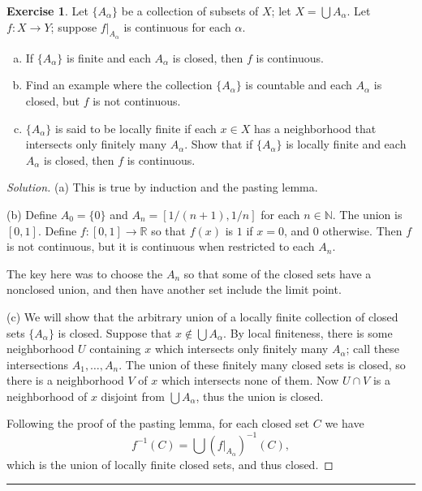 \documentclass{article}
\theoremstyle{definition}
\newtheorem{exercise}{Exercise}[section]
\begin{document}
\begin{exercise}
  Let $\{A_\alpha\}$ be a collection of subsets of $X$; let $X = \bigcup A_\alpha$. Let $f:X\to Y$; suppose $f|_{A_\alpha}$ is continuous for each $\alpha$.
  \begin{enumerate}[(a)]
    \item If $\{A_\alpha\}$ is finite and each $A_\alpha$ is closed, then $f$ is continuous.
    \item Find an example where the collection $\{A_\alpha\}$ is countable and each $A_\alpha$ is closed, but $f$ is not continuous.
    \item $\{A_\alpha\}$ is said to be locally finite if each $x\in X$ has a neighborhood that intersects only finitely many $A_\alpha$. Show that if $\{A_\alpha\}$ is locally finite and each $A_\alpha$ is closed, then $f$ is continuous.
  \end{enumerate}
\end{exercise}
\begin{proof}[Solution]
  (a) This is true by induction and the pasting lemma.
  
  (b) Define $A_0 = \{0\}$ and $A_n = [1/(n+1),1/n]$ for each $n\in\mathbb{N}$. The union is $[0,1]$. Define $f:[0,1]\to\mathbb{R}$ so that $f(x)$ is $1$ if $x = 0$, and $0$ otherwise. Then $f$ is not continuous, but it is continuous when restricted to each $A_n$.

  The key here was to choose the $A_n$ so that some of the closed sets have a nonclosed union, and then have another set include the limit point.

  (c) We will show that the arbitrary union of a locally finite collection of closed sets $\{A_\alpha\}$ is closed. Suppose that $x\notin \bigcup A_\alpha$. By local finiteness, there is some neighborhood $U$ containing $x$ which intersects only finitely many $A_\alpha$; call these intersections $A_1,\dots,A_n$. The union of these finitely many closed sets is closed, so there is a neighborhood $V$ of $x$ which intersects none of them. Now $U\cap V$ is a neighborhood of $x$ disjoint from $\bigcup A_\alpha$, thus the union is closed.

  Following the proof of the pasting lemma, for each closed set $C$ we have
  $$f^{-1}(C) = \bigcup(f|_{A_\alpha})^{-1}(C),$$
  which is the union of locally finite closed sets, and thus closed.
\end{proof}

\hrule
\end{document}
